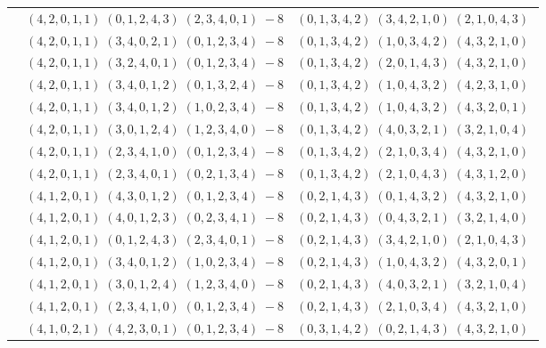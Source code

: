 \documentclass[11pt]{article}
\begin{document}
\begin{longtable}[l]{|c|c|c|}
 \cline{2-3} 
 & $(4 ,2 ,0 ,1 ,1) \;(0 ,1 ,2 ,4 ,3) \;(2 ,3 ,4 ,0 ,1) \;-8$ & $(0 ,1 ,3 ,4 ,2) \;(3 ,4 ,2 ,1 ,0) \;(2 ,1 ,0 ,4 ,3) \;$\\ 
 \cline{2-3} 
 & $(4 ,2 ,0 ,1 ,1) \;(3 ,4 ,0 ,2 ,1) \;(0 ,1 ,2 ,3 ,4) \;-8$ & $(0 ,1 ,3 ,4 ,2) \;(1 ,0 ,3 ,4 ,2) \;(4 ,3 ,2 ,1 ,0) \;$\\ 
 \cline{2-3} 
 & $(4 ,2 ,0 ,1 ,1) \;(3 ,2 ,4 ,0 ,1) \;(0 ,1 ,2 ,3 ,4) \;-8$ & $(0 ,1 ,3 ,4 ,2) \;(2 ,0 ,1 ,4 ,3) \;(4 ,3 ,2 ,1 ,0) \;$\\ 
 \cline{2-3} 
 & $(4 ,2 ,0 ,1 ,1) \;(3 ,4 ,0 ,1 ,2) \;(0 ,1 ,3 ,2 ,4) \;-8$ & $(0 ,1 ,3 ,4 ,2) \;(1 ,0 ,4 ,3 ,2) \;(4 ,2 ,3 ,1 ,0) \;$\\ 
 \cline{2-3} 
 & $(4 ,2 ,0 ,1 ,1) \;(3 ,4 ,0 ,1 ,2) \;(1 ,0 ,2 ,3 ,4) \;-8$ & $(0 ,1 ,3 ,4 ,2) \;(1 ,0 ,4 ,3 ,2) \;(4 ,3 ,2 ,0 ,1) \;$\\ 
 \cline{2-3} 
 & $(4 ,2 ,0 ,1 ,1) \;(3 ,0 ,1 ,2 ,4) \;(1 ,2 ,3 ,4 ,0) \;-8$ & $(0 ,1 ,3 ,4 ,2) \;(4 ,0 ,3 ,2 ,1) \;(3 ,2 ,1 ,0 ,4) \;$\\ 
 \cline{2-3} 
 & $(4 ,2 ,0 ,1 ,1) \;(2 ,3 ,4 ,1 ,0) \;(0 ,1 ,2 ,3 ,4) \;-8$ & $(0 ,1 ,3 ,4 ,2) \;(2 ,1 ,0 ,3 ,4) \;(4 ,3 ,2 ,1 ,0) \;$\\ 
 \cline{2-3} 
 & $(4 ,2 ,0 ,1 ,1) \;(2 ,3 ,4 ,0 ,1) \;(0 ,2 ,1 ,3 ,4) \;-8$ & $(0 ,1 ,3 ,4 ,2) \;(2 ,1 ,0 ,4 ,3) \;(4 ,3 ,1 ,2 ,0) \;$\\ 
 \cline{2-3} 
 & $(4 ,1 ,2 ,0 ,1) \;(4 ,3 ,0 ,1 ,2) \;(0 ,1 ,2 ,3 ,4) \;-8$ & $(0 ,2 ,1 ,4 ,3) \;(0 ,1 ,4 ,3 ,2) \;(4 ,3 ,2 ,1 ,0) \;$\\ 
 \cline{2-3} 
 & $(4 ,1 ,2 ,0 ,1) \;(4 ,0 ,1 ,2 ,3) \;(0 ,2 ,3 ,4 ,1) \;-8$ & $(0 ,2 ,1 ,4 ,3) \;(0 ,4 ,3 ,2 ,1) \;(3 ,2 ,1 ,4 ,0) \;$\\ 
 \cline{2-3} 
 & $(4 ,1 ,2 ,0 ,1) \;(0 ,1 ,2 ,4 ,3) \;(2 ,3 ,4 ,0 ,1) \;-8$ & $(0 ,2 ,1 ,4 ,3) \;(3 ,4 ,2 ,1 ,0) \;(2 ,1 ,0 ,4 ,3) \;$\\ 
 \cline{2-3} 
 & $(4 ,1 ,2 ,0 ,1) \;(3 ,4 ,0 ,1 ,2) \;(1 ,0 ,2 ,3 ,4) \;-8$ & $(0 ,2 ,1 ,4 ,3) \;(1 ,0 ,4 ,3 ,2) \;(4 ,3 ,2 ,0 ,1) \;$\\ 
 \cline{2-3} 
 & $(4 ,1 ,2 ,0 ,1) \;(3 ,0 ,1 ,2 ,4) \;(1 ,2 ,3 ,4 ,0) \;-8$ & $(0 ,2 ,1 ,4 ,3) \;(4 ,0 ,3 ,2 ,1) \;(3 ,2 ,1 ,0 ,4) \;$\\ 
 \cline{2-3} 
 & $(4 ,1 ,2 ,0 ,1) \;(2 ,3 ,4 ,1 ,0) \;(0 ,1 ,2 ,3 ,4) \;-8$ & $(0 ,2 ,1 ,4 ,3) \;(2 ,1 ,0 ,3 ,4) \;(4 ,3 ,2 ,1 ,0) \;$\\ 
 \cline{2-3} 
 & $(4 ,1 ,0 ,2 ,1) \;(4 ,2 ,3 ,0 ,1) \;(0 ,1 ,2 ,3 ,4) \;-8$ & $(0 ,3 ,1 ,4 ,2) \;(0 ,2 ,1 ,4 ,3) \;(4 ,3 ,2 ,1 ,0) \;$\\ 

\end{longtable}
\end{document}
